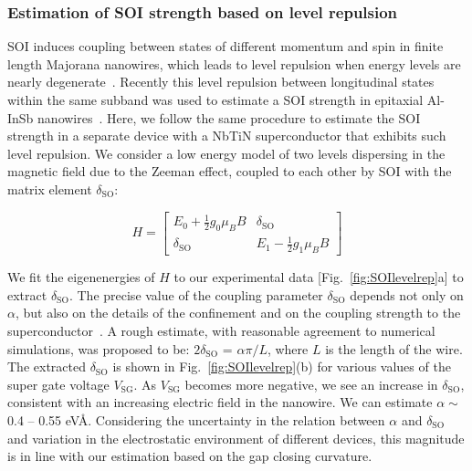 \subsubsection{Estimation of SOI strength based on level repulsion}\label{sec:level_rep}
SOI induces coupling between states of different momentum and spin in finite length Majorana nanowires, which leads to level repulsion when energy levels are nearly degenerate~\cite{Stanescu2013}.
Recently this level repulsion between longitudinal states within the same subband was used to estimate a SOI strength in epitaxial Al-InSb nanowires~\cite{Moor2018}.
Here, we follow the same procedure to estimate the SOI strength in a separate device with a NbTiN superconductor that exhibits such level repulsion.
We consider a low energy model of two levels dispersing in the magnetic field due to the Zeeman effect, coupled to each other by SOI with the matrix element $\delta_{\mathrm{SO}}$:

\begin{equation}\label{eq:S3}
H = \begin{bmatrix}
E_0 + \frac{1}{2}g_0 \mu_B B & \delta_{\mathrm{SO}} \\
\delta_{\mathrm{SO}} & E_1 - \frac{1}{2}g_1 \mu_B B
\end{bmatrix}
\end{equation}

We fit the eigenenergies of $H$ to our experimental data [Fig.~\ref{fig:SOIlevelrep}a] to extract $\delta_{\mathrm{SO}}$.
The precise value of the coupling parameter $\delta_{\mathrm{SO}}$ depends not only on $\alpha$, but also on the details of the confinement and on the coupling strength to the superconductor~\cite{Moor2018}.
A rough estimate, with reasonable agreement to numerical simulations, was proposed to be: $2\delta_{\mathrm{SO}}$ = $\alpha \pi/ L$, where $L$ is the length of the wire.
The extracted $\delta_{\mathrm{SO}}$ is shown in Fig.~\ref{fig:SOIlevelrep}(b) for various values of the super gate voltage $V_{\mathrm{SG}}$.
As $V_{\mathrm{SG}}$ becomes more negative, we see an increase in $\delta_{\mathrm{SO}}$, consistent with an increasing electric field in the nanowire.
We can estimate $\alpha \sim$ 0.4 -- 0.55 eV\AA.
Considering the uncertainty in the relation between $\alpha$ and $\delta_{\mathrm{SO}}$ and variation in the electrostatic environment of different devices, this magnitude is in line with our estimation based on the gap closing curvature.

